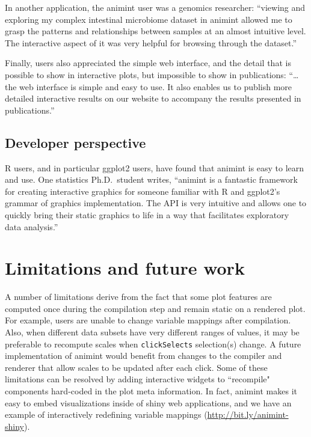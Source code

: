 \documentclass[12pt,]{isuthesis}
\begin{document}
In another application, the animint user was a genomics researcher:
``viewing and exploring my complex intestinal microbiome dataset in
animint allowed me to grasp the patterns and relationships between
samples at an almost intuitive level. The interactive aspect of it was
very helpful for browsing through the dataset.''

Finally, users also appreciated the simple web interface, and the detail
that is possible to show in interactive plots, but impossible to show in
publications: ``\ldots{} the web interface is simple and easy to use. It
also enables us to publish more detailed interactive results on our
website to accompany the results presented in publications.''

\subsection{Developer perspective}

R users, and in particular ggplot2 users, have found that animint is
easy to learn and use. One statistics Ph.D.~student writes, ``animint is
a fantastic framework for creating interactive graphics for someone
familiar with R and ggplot2's grammar of graphics implementation. The
API is very intuitive and allows one to quickly bring their static
graphics to life in a way that facilitates exploratory data analysis.''

\section{Limitations and future work}
\label{sec:limitations}

A number of limitations derive from the fact that some plot features are
computed once during the compilation step and remain static on a
rendered plot. For example, users are unable to change variable mappings
after compilation. Also, when different data subsets have very different
ranges of values, it may be preferable to recompute scales when
\texttt{clickSelects} selection(s) change. A future implementation of
animint would benefit from changes to the compiler and renderer that
allow scales to be updated after each click. Some of these limitations
can be resolved by adding interactive widgets to ``recompile" components
hard-coded in the plot meta information. In fact, animint makes it easy
to embed visualizations inside of shiny web applications, and we have an
example of interactively redefining variable mappings
(\url{http://bit.ly/animint-shiny}).
\end{document}
